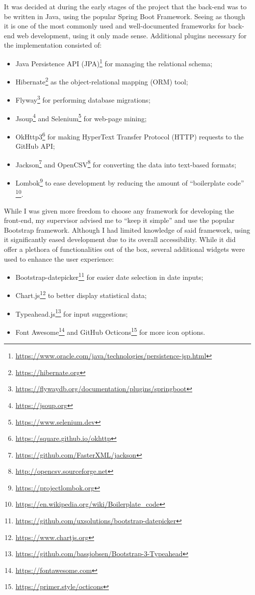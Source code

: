 It was decided at during the early stages of the project that the back-end was to be written in Java, using the popular Spring Boot Framework.
Seeing as though it is one of the most commonly used and well-documented frameworks for back-end web development, using it only made sense.
Additional plugins necessary for the implementation consisted of:
\begin{itemize}
    \item Java Persistence API (JPA)\footnote{\url{https://www.oracle.com/java/technologies/persistence-jsp.html}} for managing the relational schema;
    \item Hibernate\footnote{\url{https://hibernate.org}} as the object-relational mapping (ORM) tool;
    \item Flyway\footnote{\url{https://flywaydb.org/documentation/plugins/springboot}} for performing database migrations;
    \item Jsoup\footnote{\url{https://jsoup.org}} and Selenium\footnote{\url{https://www.selenium.dev}} for web-page mining;
    \item OkHttp3\footnote{\url{https://square.github.io/okhttp}} for making HyperText Transfer Protocol (HTTP) requests to the GitHub API;
    \item Jackson\footnote{\url{https://github.com/FasterXML/jackson}} and OpenCSV\footnote{\url{http://opencsv.sourceforge.net}} for converting the data into text-based formats;
    \item Lombok\footnote{\url{https://projectlombok.org}} to ease development by reducing the amount of ``boilerplate code'' \footnote{\url{https://en.wikipedia.org/wiki/Boilerplate_code}}.
\end{itemize}

While I was given more freedom to choose any framework for developing the front-end, my supervisor advised me to ``keep it simple'' and use the popular Bootstrap framework.
Although I had limited knowledge of said framework, using it significantly eased development due to its overall accessibility.
While it did offer a plethora of functionalities out of the box, several additional widgets were used to enhance the user experience:
\begin{itemize}
    \item Bootstrap-datepicker\footnote{\url{https://github.com/uxsolutions/bootstrap-datepicker}} for easier date selection in date inputs;
    \item Chart.js\footnote{\url{https://www.chartjs.org}} to better display statistical data;
    \item Typeahead.js\footnote{\url{https://github.com/bassjobsen/Bootstrap-3-Typeahead}} for input suggestions;
    \item Font Awesome\footnote{\url{https://fontawesome.com}} and GitHub Octicons\footnote{\url{https://primer.style/octicons}} for more icon options.
\end{itemize}

